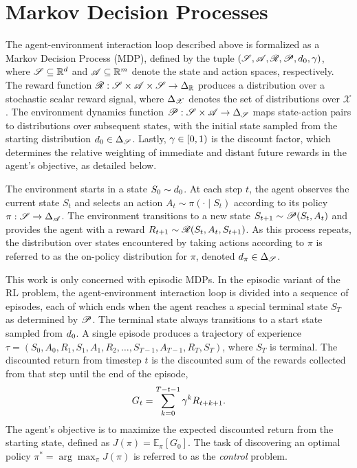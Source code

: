   \section{Markov Decision Processes}
  The agent-environment interaction loop described above is formalized as a Markov Decision Process (MDP), defined by the tuple $(\mathscr{S}, \mathscr{A}, \mathscr{R}, \mathscr{P}, d_{0}, \gamma)$, where $\mathscr{S} \subseteq \mathbb{R}^d$ and $\mathscr{A} \subseteq \mathbb{R}^m$ denote the state and action spaces, respectively. The reward function
  $\mathscr{R}: \mathscr{S} \times \mathscr{A} \times \mathscr{S} \to \Delta_{\mathbb{R}}$ produces a distribution over a stochastic scalar reward signal, where $\Delta_{\mathscr{X}}$ denotes
  the set of distributions over $\mathscr{X}$. The environment dynamics function $\mathscr{P}: \mathscr{S} \times \mathscr{A} \to \Delta_{\mathscr{S}}$
  maps state-action pairs to distributions over subsequent states, with the initial state sampled from the starting distribution
  $d_{0} \in \Delta_{\mathscr{S}}$. Lastly, $\gamma \in [0, 1)$ is the discount factor, which determines the relative weighting of immediate and distant future rewards in the agent's objective, as detailed below. 
  
  The environment starts in a state $S_0 \sim d_{0}$. At each step $t$, the agent observes
  the current state $S_t$ and selects an action $A_t \sim \pi(\cdot \mid S_t)$ according to its policy $\pi:
  \mathscr{S} \to \Delta_{\mathscr{A}}$. The environment transitions to a new state $S_{t + 1} \sim
  \mathscr{P}(S_t, A_t)$ and provides the agent with a reward $R_{t+1} \sim \mathscr{R}(S_t, A_t, S_{t + 1})$. As this process repeats, the distribution over states encountered by taking actions according to $\pi$ is referred to as the on-policy distribution for $\pi$, denoted $d_{\pi} \in \Delta_{\mathscr{S}}$. 
  
  This work is only concerned with episodic MDPs. In the episodic variant of the RL problem, the agent-environment interaction loop is divided into a sequence of episodes, each of which ends when the agent reaches a special terminal state $S_T$ as determined by $\mathscr{P}$. The terminal state always transitions to a start state sampled from $d_{0}$. A single episode produces a trajectory of experience $\tau = (S_0, A_0, R_1, S_1, A_1, R_2, \dots, S_{T-1}, A_{T-1}, R_T, S_T)$, where $S_T$ is terminal. The discounted return from timestep $t$ is the discounted sum of the rewards collected from that step until the end of the episode,
  \begin{equation}
      G_t = \sum_{k=0}^{T - t - 1} \gamma^k R_{t + k + 1}.
      \label{eq:return}
  \end{equation}
  The agent's objective is to maximize the expected discounted return from the starting state, defined as $J(\pi) = \mathbb{E}_\pi \left[ G_0 \right]$. The task of discovering an optimal policy $\pi^* = \arg\max_\pi J(\pi)$ is referred to as the \textit{control} problem.
  
